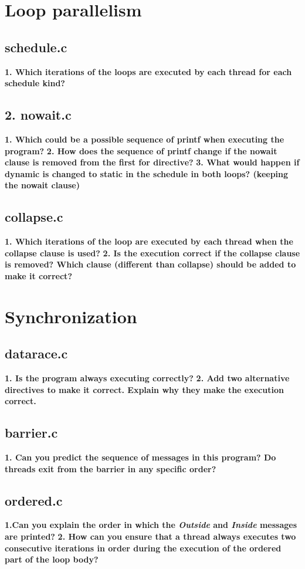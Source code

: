 \documentclass[12]{article}
\begin{document}
\section{Loop parallelism}
\subsection{schedule.c}
\textbf{1. Which iterations of the loops are executed by each thread for each schedule kind?}

\subsection{2. nowait.c}
\textbf{1. Which could be a possible sequence of printf when executing the program?}
\textbf{2. How does the sequence of printf change if the nowait clause is removed from the first for
directive?}
\textbf{3. What would happen if dynamic is changed to static in the schedule in both loops? (keeping
the nowait clause)}
\subsection{collapse.c}
\textbf{1. Which iterations of the loop are executed by each thread when the collapse clause is used?}
\textbf{2. Is the execution correct if the collapse clause is removed? Which clause (different than
collapse) should be added to make it correct?}
\section{Synchronization}
\subsection{datarace.c} 
\textbf{1. Is the program always executing correctly?}
\textbf{2. Add two alternative directives to make it correct. Explain why they make the execution
correct.}
\subsection{barrier.c}
\textbf{1. Can you predict the sequence of messages in this program? Do threads exit from the barrier
in any specific order?}
\subsection{ordered.c}
\textbf{1.Can you explain the order in which the \textit{Outside} and \textit{Inside} messages are printed?}
\textbf{2. How can you ensure that a thread always executes two consecutive iterations in order during the execution of the ordered part of the loop body?}
\end{document}

